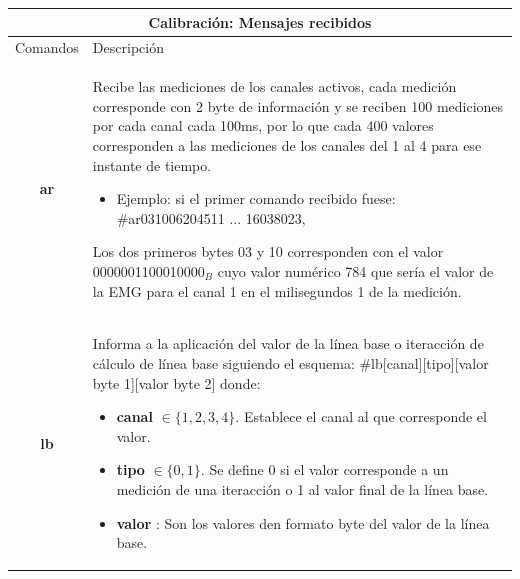 \begin{table}[ht]
    \centering
    \begin{tabular}{ |c|p{14cm}|}
        \hline
        \multicolumn{2}{|c|}{Calibración: Mensajes recibidos} \\
        \hline
        Comandos        &   Descripción \\\hline
        \textbf{ar}     &   \begin{minipage}{14cm}
                                \vspace{2pt}    
                                Recibe las mediciones de los canales activos, cada medición corresponde con 2 byte de información y se reciben 100 mediciones por cada canal cada 100ms, por lo que cada 400 valores corresponden a las mediciones de los canales del 1 al 4 para ese instante de tiempo.
                                \begin{itemize}
                                    \item Ejemplo: si el primer comando recibido fuese: \#ar031006204511 ... 16038023,
                                \end{itemize}
                                Los dos primeros bytes 03 y 10 corresponden con el valor 0000001100010000$_{B}$ cuyo valor numérico  784 que sería el valor de la EMG para el canal 1 en el milisegundos 1 de la medición.
                                \vspace{2pt}    
                            \end{minipage}\\\hline    
        \textbf{lb}     &   \begin{minipage}{14cm}
                                \vspace{1pt}
                                Informa a la aplicación del valor de la línea base o iteracción de cálculo de línea base siguiendo el esquema: \#lb[canal][tipo][valor byte 1][valor byte 2] donde:
                                \begin{itemize}
                                    \item \textbf{canal} $\in \{ 1, 2, 3, 4\}$. Establece el canal al que corresponde el valor.
                                    \item \textbf{tipo} $\in \{ 0, 1\}$. Se define 0 si el valor corresponde a un medición de una iteracción o 1 al valor final de la línea base.
                                    \item \textbf{valor} : Son los valores den formato byte del valor de la línea base.  

\end{itemize}
\end{minipage}
\end{tabular}
\end{table}
